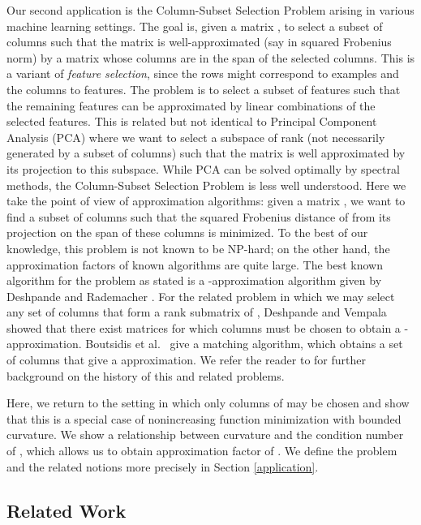 \documentclass{article}
\theoremstyle{definition}
\begin{document}
Our second application is the Column-Subset Selection Problem  arising in various machine learning settings. The goal is, given a matrix , to select a subset of  columns such that the matrix is well-approximated (say in squared Frobenius norm) by a matrix whose columns are in the span of the selected  columns. This is a variant of {\em feature selection}, since the rows might correspond to examples and the columns to features. The problem is to select a subset of  features such that the remaining features can be approximated by linear combinations of the selected features. This is related but not identical to Principal Component Analysis (PCA) where we want to select a subspace of rank  (not necessarily generated by a subset of columns) such that the matrix is well approximated by its projection to this subspace. While PCA can be solved optimally by spectral methods, the Column-Subset Selection Problem is less well understood. Here we take the point of view of approximation algorithms: given a matrix , we want to find a subset of  columns such that the squared Frobenius distance of  from its projection on the span of these  columns is minimized.  To the best of our knowledge, this problem is not known to be NP-hard; on the other hand, the approximation factors of known algorithms are quite large.   The best known algorithm for the problem as stated is a -approximation algorithm given by Deshpande and Rademacher \cite{Deshpande2010}.  For the related problem in which we may select any set of  columns that form a rank  submatrix of , Deshpande and Vempala \cite{Deshpande2006} showed that there exist matrices for which  columns must be chosen to obtain a -approximation.  Boutsidis et al.\ \cite{Boutsidis2014} give a matching algorithm, which obtains a set of  columns that give a  approximation.  We refer the reader to \cite{Boutsidis2014} for further background on the history of this and related problems.  

Here, we return to the setting in which only  columns of  may be chosen and show that this is a special case of nonincreasing function minimization with bounded curvature.  We show a relationship between curvature and the condition number  of , which allows us to obtain approximation factor of . We define the problem and the related notions more precisely in Section \ref{application}.

\subsection{Related Work}
\label{sec:related-work}
\end{document}

